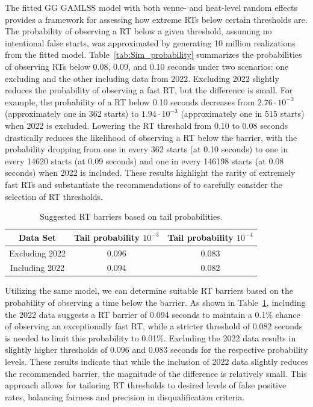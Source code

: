 \documentclass[12pt, letterpaper]{article}
\begin{document}
The fitted GG GAMLSS model with both venue- and heat-level
random effects provides a framework for assessing how extreme RTs
below certain thresholds are. The probability of observing a RT
below a given threshold, assuming no intentional false starts, was approximated
by generating 10 million realizations from the fitted model.
Table~\ref{tab:Sim_probability} summarizes the probabilities of observing
RTs below 0.08, 0.09, and 0.10 seconds under two scenarios: one
excluding and the other including data from 2022. Excluding 2022 slightly
reduces the probability of observing a fast RT, but the difference
is small. For example, the probability of a RT below 0.10 seconds
decreases from $2.76 \cdot 10^{-3}$ (approximately one in 362 starts) to
$1.94 \cdot 10^{-3}$ (approximately one in 515 starts) when 2022 is excluded.
Lowering the RT threshold from 0.10 to 0.08 seconds drastically
reduces the likelihood of observing a RT below the barrier, with
the probability dropping from one in every 362 starts (at 0.10 seconds) to one
in every 14620 starts (at 0.09 seconds) and one in every 146198 starts (at 0.08
seconds) when 2022 is included. These results highlight the rarity of extremely
fast RTs and substantiate the recommendations of \citet{komi2009iaaf}
to carefully consider the selection of RT thresholds.


\begin{table}
  \centering
  \caption{Suggested RT barriers based on tail probabilities.}
  \begin{tabular}{c c c}
   \toprule
   Data Set & Tail probability  $10^{-3}$ & Tail probability $10^{-4}$ \\
   \midrule
   Excluding 2022 & $0.096$ & $0.083$ \\
   Including 2022 & $0.094$ & $0.082$ \\
   \bottomrule
  \end{tabular}
  \label{tab:Sim_time}
\end{table}

Utilizing the same model, we can determine suitable RT barriers
based on the probability of observing a time below the barrier. As shown in
Table~\ref{tab:Sim_time}, including the 2022 data suggests a RT
barrier of 0.094 seconds to maintain a 0.1\% chance of observing an
exceptionally fast RT, while a stricter threshold of 0.082 seconds
is needed to limit this probability to 0.01\%. Excluding the 2022 data results
in slightly higher thresholds of 0.096 and 0.083 seconds for the respective
probability levels. These results indicate that while the inclusion of 2022
data slightly reduces the recommended barrier, the magnitude of the difference
is relatively small. This approach allows for tailoring RT
thresholds to desired levels of false positive rates, balancing fairness and
precision in disqualification criteria.
\end{document}
